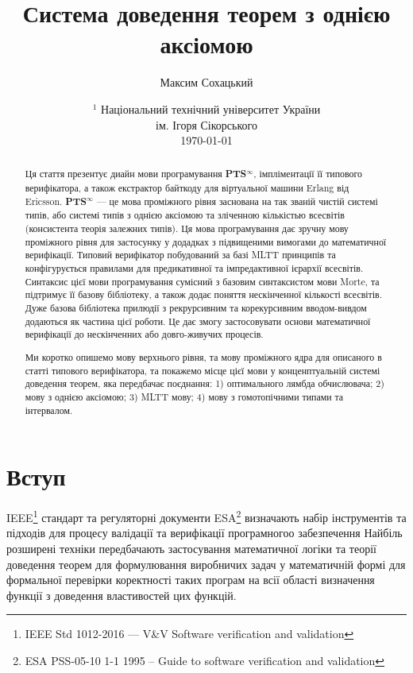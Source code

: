 \documentclass{article}
\begin{document}
\title{Система доведення теорем з однією аксіомою}
\author{Максим Сохацький}
\date{ $^1$ Національний технічний університет України \\
       \small ім. Ігоря Сікорського\\
       \today }

\maketitle

\begin{abstract}
Ця стаття презентує диайн мови програмування \textbf{PTS$^\infty$}, імпліментації її типового верифікатора,
а також екстрактор байткоду для віртуальної машини Erlang від Ericsson. \textbf{PTS$^\infty$} — це
мова проміжного рівня заснована на так званій чистій системі типів, або системі типів з однією аксіомою та
зліченною кількістью всесвітів (консистента теорія залежних типів). Ця мова програмування дає зручну
мову проміжного рівня для застосунку у додадках з підвищеними вимогами до математичної верифікації.
Типовий верифікатор побудований за базі MLTT принципів та конфігурується правилами для предикативної та імпредактивної ієрархії всесвітів.
Синтаксис цієї мови програмування сумісний з базовим синтаксистом мови Morte, та підтримує її базову бібліотеку,
а також додає поняття нескінченної кількості всесвітів. Дуже базова бібліотека прилюдії з рекрурсивним та
корекурсивним вводом-вивдом додаються як частина цієї роботи. Це дає змогу застосовувати основи
математичної верифікації до нескінченних або довго-живучих процесів.

Ми коротко опишемо мову верхнього рівня, та мову проміжного ядра для описаного в статті типового верифікатора,
та покажемо місце цієї мови у конценптуальній системі доведення теорем, яка передбачає поєднання: 1) оптимального лямбда обчислювача;
2) мову з однією аксіомою; 3) MLTT мову; 4) мову з гомотопічними типами та інтервалом.
\end{abstract}

\newpage
\tableofcontents
\newpage

\section{Вступ}
IEEE\footnote{IEEE Std 1012-2016  --- V\&V Software verification and validation} стандарт
та регуляторні документи ESA\footnote{ESA PSS-05-10 1-1 1995 -- Guide to software verification and validation} 
визначають набір інструментів та підходів для процесу валідації та верифікації програмногоо забезпечення
Найбіль розширені техніки передбачають застосування математичної логіки та теорії доведення теорем для
формулювання виробничих задач у математичній формі для формальної перевірки коректності таких програм на всії області визначення функції
з доведення властивостей цих функцій.
\end{document}
